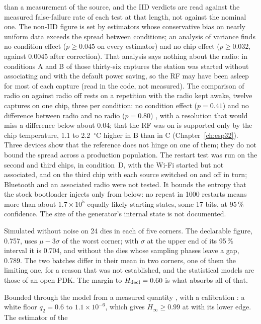 \begin{description}
than a measurement of the source, and the IID verdicts are read against
the measured false-failure rate of each test at that length, not against
the nominal one. The non-IID figure is set by estimators whose
conservative bias on nearly uniform data exceeds the spread between
conditions; an analysis of variance finds no condition effect
($p \ge 0.045$ on every estimator) and no chip effect ($p \ge 0.032$,
against 0.0045 after correction). That analysis says nothing about the
radio: in conditions A and B of those thirty-six captures the station was
started without associating and with the default power saving, so the RF
may have been asleep for most of each capture (read in the code, not
measured). The comparison of radio on against radio off rests on a
repetition with the radio kept awake, twelve captures on one chip, three
per condition: no condition effect ($p = 0.41$) and no difference between
radio and no radio ($p = 0.80$) \meas{}, with a resolution that would
miss a difference below about 0.04; that the RF was on is supported only
by the chip temperature, 1.1 to 2.2~$^\circ$C higher in B than in C
(Chapter~\ref{ch:esp32}). Three devices show that the reference
does not hinge on one of them; they do not bound the spread across a
production population. The restart test was run on the second and third
chips, in
condition~D, with the Wi-Fi started but not associated, and on the third
chip with each source switched on and off in turn; Bluetooth and an
associated radio were not tested. It bounds the entropy that the stock bootloader injects
only from below: no repeat in 1000 restarts means more than about
$1.7\times10^5$ equally likely starting states, some 17 bits, at 95\,\%
confidence. The size of the generator's internal state is not documented.
\item[Bias of the sampling flip-flop.] Simulated without noise \simu{}
on 24 dies in each of five corners. The declarable figure, 0.757, uses
$\mu - 3\sigma$ of the worst corner; with $\sigma$ at the upper end of
its 95\,\% interval it is 0.704, and without the dies whose sampling
phases leave a gap, 0.789. The two batches differ in their mean in two
corners, one of them the limiting one,
for a reason that was not established, and the statistical models are
those of an open \ac{PDK}. The margin to $H_{\mathrm{decl}} = 0.60$ is what absorbs
all of that.
\item[Min-entropy on the \ac{FPGA}.] Bounded through the
model from a measured quantity \meas{}, with a calibration \simu{}: a
white floor $q_2 = 0.6$ to $1.1\times10^{-6}$, which gives
$H_\infty \ge 0.99$ at  with its lower edge. The estimator of the

\end{description}
